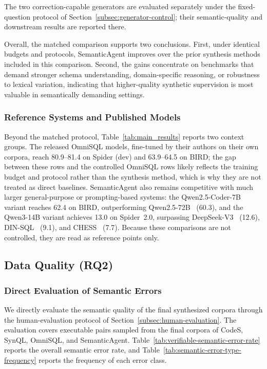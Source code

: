 \documentclass[letterpaper,journal]{IEEEtran}
\begin{document}
The two correction-capable generators are evaluated separately under the fixed-question protocol of Section~\ref{subsec:generator-control}; their semantic-quality and downstream results are reported there.

Overall, the matched comparison supports two conclusions. First, under identical budgets and protocols, SemanticAgent improves over the prior synthesis methods included in this comparison. Second, the gains concentrate on benchmarks that demand stronger schema understanding, domain-specific reasoning, or robustness to lexical variation, indicating that higher-quality synthetic supervision is most valuable in semantically demanding settings.

\subsubsection{Reference Systems and Published Models}

Beyond the matched protocol, Table~\ref{tab:main_results} reports two context groups. The released OmniSQL models, fine-tuned by their authors on their own corpora, reach 80.9--81.4 on Spider (dev) and 63.9--64.5 on BIRD; the gap between these rows and the controlled OmniSQL rows likely reflects the training budget and protocol rather than the synthesis method, which is why they are not treated as direct baselines. SemanticAgent also remains competitive with much larger general-purpose or prompting-based systems: the Qwen2.5-Coder-7B variant reaches 62.4 on BIRD, outperforming Qwen2.5-72B~\cite{yang2024qwen25} (60.3), and the Qwen3-14B variant achieves 13.0 on Spider~2.0, surpassing DeepSeek-V3~\cite{liu2024deepseekv3} (12.6), DIN-SQL~\cite{pourreza2023din} (9.1), and CHESS~\cite{talaei2024chess} (7.7). Because these comparisons are not controlled, they are read as reference points only.

\subsection{Data Quality (RQ2)}

\subsubsection{Direct Evaluation of Semantic Errors}
\label{subsec:direct-semantic-evaluation}

We directly evaluate the semantic quality of the final synthesized corpora through the human-evaluation protocol of Section~\ref{subsec:human-evaluation}. The evaluation covers executable pairs sampled from the final corpora of CodeS, SynQL, OmniSQL, and SemanticAgent. Table~\ref{tab:verifiable-semantic-error-rate} reports the overall semantic error rate, and Table~\ref{tab:semantic-error-type-frequency} reports the frequency of each error class.
\end{document}
